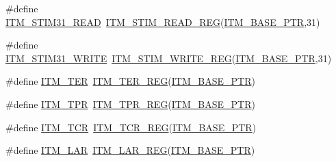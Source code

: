\begin{DoxyCompactItemize}
\item 
\#define \hyperlink{group___i_t_m___register___accessor___macros_ga6643b5b69131aa2163f02c7d27c2305c}{I\+T\+M\+\_\+\+S\+T\+I\+M31\+\_\+\+R\+E\+AD}~\hyperlink{group___i_t_m___register___accessor___macros_ga5009882336aadcd4f37b45cf3395c450}{I\+T\+M\+\_\+\+S\+T\+I\+M\+\_\+\+R\+E\+A\+D\+\_\+\+R\+EG}(\hyperlink{group___i_t_m___peripheral_gafaddee8fe8b6a898d4e5edc43ee0d703}{I\+T\+M\+\_\+\+B\+A\+S\+E\+\_\+\+P\+TR},31)
\item 
\#define \hyperlink{group___i_t_m___register___accessor___macros_gab792df922db5e627bc1d9917ff6b4ac2}{I\+T\+M\+\_\+\+S\+T\+I\+M31\+\_\+\+W\+R\+I\+TE}~\hyperlink{group___i_t_m___register___accessor___macros_ga049ca92a4e78e77c19af81e51aa73f1c}{I\+T\+M\+\_\+\+S\+T\+I\+M\+\_\+\+W\+R\+I\+T\+E\+\_\+\+R\+EG}(\hyperlink{group___i_t_m___peripheral_gafaddee8fe8b6a898d4e5edc43ee0d703}{I\+T\+M\+\_\+\+B\+A\+S\+E\+\_\+\+P\+TR},31)
\item 
\#define \hyperlink{group___i_t_m___register___accessor___macros_ga18c94f3236b7d64c83e63cdd586e5e9b}{I\+T\+M\+\_\+\+T\+ER}~\hyperlink{group___i_t_m___register___accessor___macros_ga0952675d3a89701dd186427f1c52c919}{I\+T\+M\+\_\+\+T\+E\+R\+\_\+\+R\+EG}(\hyperlink{group___i_t_m___peripheral_gafaddee8fe8b6a898d4e5edc43ee0d703}{I\+T\+M\+\_\+\+B\+A\+S\+E\+\_\+\+P\+TR})
\item 
\#define \hyperlink{group___i_t_m___register___accessor___macros_ga4a106555b6d58115c86e09d48e199572}{I\+T\+M\+\_\+\+T\+PR}~\hyperlink{group___i_t_m___register___accessor___macros_gaae645266e2d2ce5b4085486432dee954}{I\+T\+M\+\_\+\+T\+P\+R\+\_\+\+R\+EG}(\hyperlink{group___i_t_m___peripheral_gafaddee8fe8b6a898d4e5edc43ee0d703}{I\+T\+M\+\_\+\+B\+A\+S\+E\+\_\+\+P\+TR})
\item 
\#define \hyperlink{group___i_t_m___register___accessor___macros_ga935f0be267215442b7cffb0a191c7223}{I\+T\+M\+\_\+\+T\+CR}~\hyperlink{group___i_t_m___register___accessor___macros_gaded31ba9ed7d78748d2ec3fb8746caff}{I\+T\+M\+\_\+\+T\+C\+R\+\_\+\+R\+EG}(\hyperlink{group___i_t_m___peripheral_gafaddee8fe8b6a898d4e5edc43ee0d703}{I\+T\+M\+\_\+\+B\+A\+S\+E\+\_\+\+P\+TR})
\item 
\#define \hyperlink{group___i_t_m___register___accessor___macros_gaf40951af1991b1b46200b122399187b3}{I\+T\+M\+\_\+\+L\+AR}~\hyperlink{group___i_t_m___register___accessor___macros_ga20b6604c5d16c42c91578bb58acc8249}{I\+T\+M\+\_\+\+L\+A\+R\+\_\+\+R\+EG}(\hyperlink{group___i_t_m___peripheral_gafaddee8fe8b6a898d4e5edc43ee0d703}{I\+T\+M\+\_\+\+B\+A\+S\+E\+\_\+\+P\+TR})
\item 

\end{DoxyCompactItemize}
